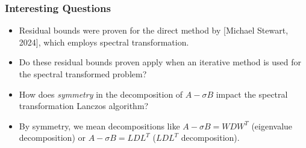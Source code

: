 \documentclass[landscape]{beamer}
\begin{document}
\begin{frame}
  \frametitle {Interesting Questions}
	\begin{center}
		\begin{itemize}
				\item Residual bounds were proven for the direct method by [Michael Stewart,
				2024], which employs spectral transformation.
                \item \large Do these residual bounds proven apply when an iterative method is used for the spectral transformed problem?
			\item \large How does \emph{symmetry} in the decomposition of $A-\sigma B$ impact the spectral transformation Lanczos algorithm?
			\item By symmetry, we mean decompositions like $A-\sigma B = WDW^T$ (eigenvalue decomposition) or $A-\sigma B=LDL^T$ ($LDL^T$ decomposition).
		\end{itemize}
	\end{center}
\end{frame}

\end{document}
